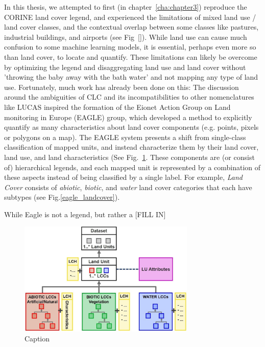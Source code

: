         In this thesis, we attempted to first (in chapter\@~\ref{cha:chapter3}) reproduce the CORINE land cover legend, and experienced the limitations of mixed land use / land cover classes, and the contextual overlap between some classes like pastures, industrial buildings, and airports (see Fig\@~\ref{}). While land use can cause much confusion to some machine learning models, it is essential, perhaps even more so than land cover, to locate and quantify. These limitations can likely be overcome by optimizing the legend and disaggregating land use and land cover without 'throwing the baby away with the bath water' and not mapping any type of land use.
        Fortunately, much work has already been done on this: The discussion around the ambiguities of CLC and its incompatibilities to other nomenclatures like LUCAS inspired the formation of the Eionet Action Group on Land monitoring in Europe (EAGLE) group, which developed a method to explicitly quantify as many characteristics about land cover components (e.g. points, pixels or polygons on a map). The EAGLE system presents a shift from single-class classification of mapped units, and instead characterize them by their land cover, land use, and land characteristics (See Fig.\@~\ref{fig:eagle_structure}. These components are (or consist of) hierarchical legends, and each mapped unit is represented by a combination of these aspects instead of being classified by a single label. For example, \textit{Land Cover} consists of \textit{abiotic}, \textit{biotic}, and \textit{water} land cover categories that each have subtypes (see Fig.\@\ref{eagle_landcover}). 
        
        While Eagle is not a legend, but rather a [FILL IN]
        
        \begin{figure}[H]
            \centering
            \includegraphics[width=0.75\textwidth]{figs_01/eagle_structure.png}
            \caption{Caption}
            \label{fig:eagle_structure}
        \end{figure}

